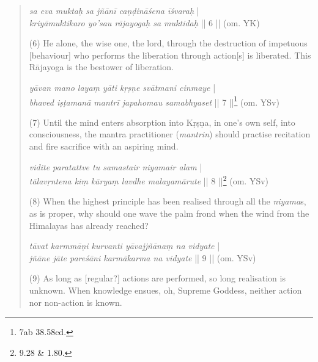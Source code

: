 \begin{quote}
\begin{ekdosis}
\textit{sa eva muktaḥ sa jñānī caṇḍināśena īśvaraḥ} |\\
\textit{kriyāmuktikaro yo'sau rājayogaḥ sa muktidaḥ} || 6 || (om. YK)

(6) He alone, the wise one, the lord, through the destruction of impetuous [behaviour]
who performs the liberation through action[s] is liberated. This Rājayoga is the bestower of liberation.

\textit{yāvan mano layaṃ yāti kṛṣṇe svātmani cinmaye} | \\ 
\textit{bhaved iṣṭamanā mantrī japahomau samabhyaset} || 7 ||\footnote{7ab \approx {} 38.58cd.} (om. YSv) 

(7) Until the mind enters absorption into Kṛṣṇa, in one's own self, into consciousness,
the mantra practitioner (\textit{mantrin}) should practise recitation and fire sacrifice with an aspiring mind. 

\textit{vidite paratattve tu samastair niyamair alam} |\\
\textit{tālavṛntena kiṃ kāryaṃ lavdhe malayamārute} || 8 ||\footnote{\approx {} 9.28 \&  1.80.} (om. YSv) 

(8) When the highest principle has been realised through all the \textit {niyama}s, as is proper,
why should one wave the palm frond when the wind from the Himalayas has already reached?

\textit{tāvat karmmāṇi kurvanti yāvajjñānaṃ na vidyate} |\\ 
\textit{jñāne jāte pareśāni karmākarma na vidyate} || 9 || (om. YSv) 

(9) As long as [regular?] actions are performed, so long realisation is unknown.
When knowledge ensues, oh, Supreme Goddess, neither action nor non-action is known.
\end{ekdosis}
\end{quote}

